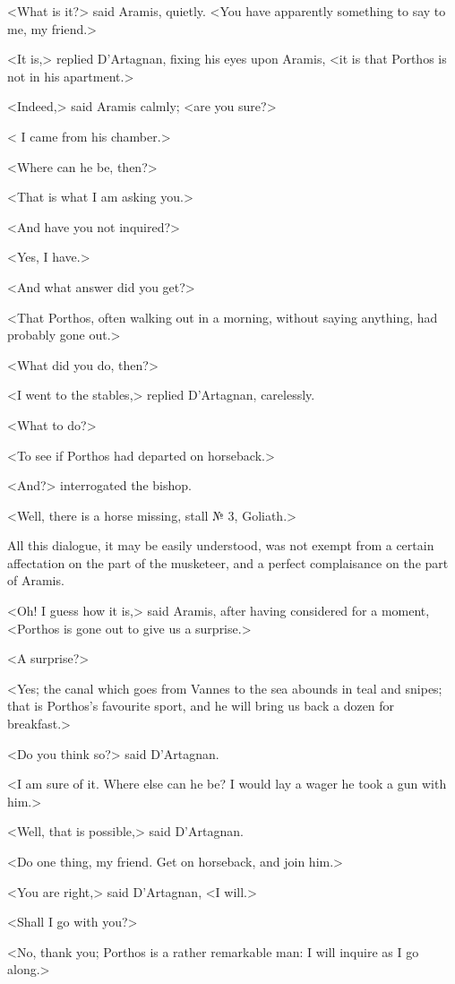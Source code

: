 <What is it?> said Aramis, quietly. <You have apparently something to say to me, my friend.>

<It is,> replied D'Artagnan, fixing his eyes upon Aramis, <it is that Porthos is not in his apartment.>

<Indeed,> said Aramis calmly; <are you sure?>

< I came from his chamber.>

<Where can he be, then?>

<That is what I am asking you.>

<And have you not inquired?>

<Yes, I have.>

<And what answer did you get?>

<That Porthos, often walking out in a morning, without saying anything, had probably gone out.>

<What did you do, then?>

<I went to the stables,> replied D'Artagnan, carelessly.

<What to do?>

<To see if Porthos had departed on horseback.>

<And?> interrogated the bishop.

<Well, there is a horse missing, stall № 3, Goliath.>

All this dialogue, it may be easily understood, was not exempt from a certain affectation on the part of the musketeer, and a perfect complaisance on the part of Aramis.

<Oh! I guess how it is,> said Aramis, after having considered for a moment, <Porthos is gone out to give us a surprise.>

<A surprise?>

<Yes; the canal which goes from Vannes to the sea abounds in teal and snipes; that is Porthos's favourite sport, and he will bring us back a dozen for breakfast.>

<Do you think so?> said D'Artagnan.

<I am sure of it. Where else can he be? I would lay a wager he took a gun with him.>

<Well, that is possible,> said D'Artagnan.

<Do one thing, my friend. Get on horseback, and join him.>

<You are right,> said D'Artagnan, <I will.>

<Shall I go with you?>

<No, thank you; Porthos is a rather remarkable man: I will inquire as I go along.>

